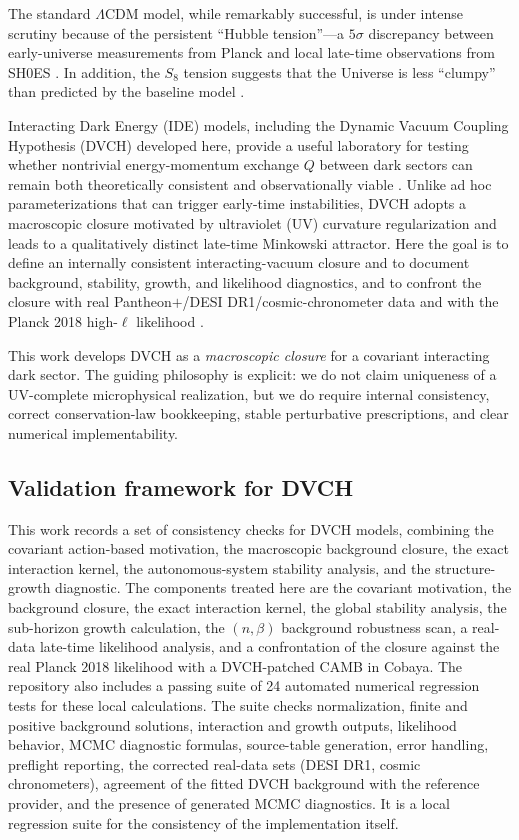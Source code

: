 \documentclass[pdflatex,sn-mathphys-num]{sn-jnl}%
\begin{document}
The standard $\Lambda$CDM model, while remarkably successful, is under intense
scrutiny because of the persistent ``Hubble tension''---a $5\sigma$
discrepancy between early-universe measurements from Planck and local
late-time observations from SH0ES \cite{Aghanim:2018eyx,Riess:2021jrx}.
In addition, the $S_8$ tension suggests that the Universe is less ``clumpy''
than predicted by the baseline model \cite{Asgari:2020wuj,Abbott:2021asy}.

Interacting Dark Energy (IDE) models, including the Dynamic Vacuum Coupling
Hypothesis (DVCH) developed here, provide a useful laboratory for testing
whether nontrivial energy-momentum exchange $Q$ between dark sectors can
remain both theoretically consistent and observationally viable
\cite{Amendola2000,Valiviita:2008iv,Wang:2016lxa}. Unlike ad hoc parameterizations that
can trigger early-time instabilities, DVCH adopts a macroscopic closure
motivated by ultraviolet (UV) curvature regularization and leads to a
qualitatively distinct late-time Minkowski attractor. Here the goal is to define an internally consistent interacting-vacuum closure and to document background, stability, growth, and likelihood diagnostics, and to confront the closure with real Pantheon$+$/DESI DR1/cosmic-chronometer data and with the Planck 2018 high-$\ell$ likelihood \cite{Sola:2017znb,Nunes:2022bov,Pan:2021dxa}.

This work develops DVCH as a \emph{macroscopic closure} for a covariant
interacting dark sector. The guiding philosophy is explicit: we do not claim
uniqueness of a UV-complete microphysical realization, but we do require
internal consistency, correct conservation-law bookkeeping, stable
perturbative prescriptions, and clear numerical implementability.

\subsection*{Validation framework for DVCH}
\label{subsec:scope_revision}

This work records a set of consistency checks for DVCH models, combining the covariant action-based motivation, the macroscopic background closure, the exact interaction kernel, the autonomous-system stability analysis, and the structure-growth diagnostic. The components treated here are the covariant motivation, the background closure, the exact interaction kernel, the global stability analysis, the sub-horizon growth calculation, the $(n,\beta)$ background robustness scan, a real-data late-time likelihood analysis, and a confrontation of the closure against the real Planck 2018 likelihood with a DVCH-patched CAMB in Cobaya. The repository also includes a passing suite of 24 automated numerical regression tests for these local calculations. The suite checks normalization, finite and positive background solutions, interaction and growth outputs, likelihood behavior, MCMC diagnostic formulas, source-table generation, error handling, preflight reporting, the corrected real-data sets (DESI DR1, cosmic chronometers), agreement of the fitted DVCH background with the reference provider, and the presence of generated MCMC diagnostics. It is a local regression suite for the consistency of the implementation itself.
\end{document}
